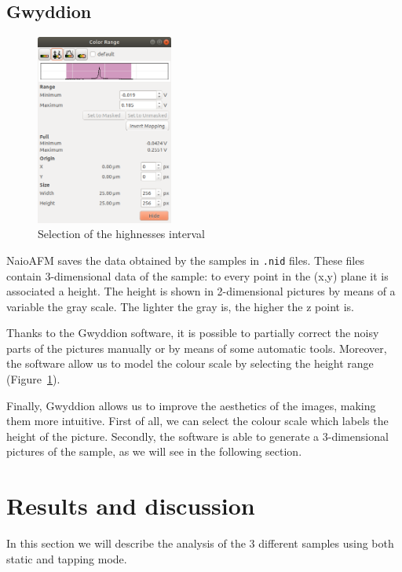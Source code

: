 \documentclass[11pt,a4paper]{article}
\begin{document}
\subsection{Gwyddion}

\begin{figure}[ht]
\centering
\includegraphics[width=0.4\textwidth]{scale_selection}
\caption{Selection of the highnesses interval}
\label{fig:scale_selection}
\end{figure}

NaioAFM saves the data obtained by the samples in \texttt{.nid} files. These files contain 3-dimensional data of the sample: to every point in the (x,y) plane it is associated a height. The height is shown in 2-dimensional pictures {\color{red}by means of a variable the gray scale}. The lighter the gray is, the higher the z point is.

Thanks to the Gwyddion software, it is possible to partially correct the noisy parts of the pictures manually or by means of some automatic tools. Moreover, the software allow us to model the colour scale by selecting the height range (Figure~\ref{fig:scale_selection}).

Finally, Gwyddion allows us to improve the aesthetics of the images, making them more intuitive. First of all, we can select the colour scale which labels the height of the picture. Secondly, the software is able to generate a 3-dimensional pictures of the sample, as we will see in the following section.

\section{Results and discussion}
In this section we will describe the analysis of the 3 different samples using both static and tapping mode.
\end{document}
